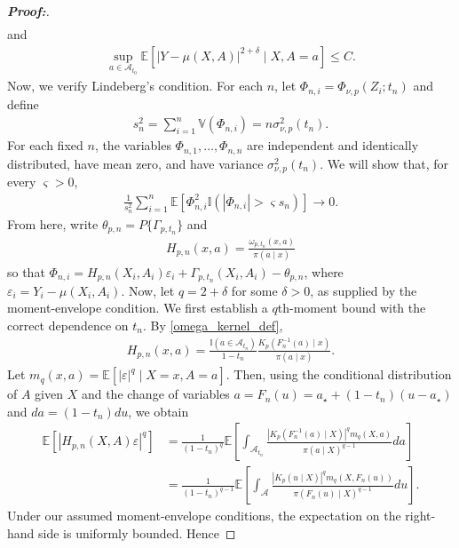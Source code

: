 \documentclass[10pt,a4paper]{amsart}
\begin{document}
\begin{proof}[\textbf{Proof:}]
\begin{align*}
\end{align*}
and
\begin{align*}
    \sup_{a\in\mathcal{A}_{t_0}} \mathbb{E}\!\left[ |Y-\mu(X,A)|^{2+\delta} \mid X,A=a \right] \leq C.
\end{align*}
Now, we verify Lindeberg's condition. For each $n$, let $\Phi_{n,i} = \Phi_{\nu,p}(Z_i;t_n)$ and define
\begin{align*}
    s_n^2 = \sum_{i=1}^{n}\mathbb{V}(\Phi_{n,i}) = n\sigma_{\nu,p}^2(t_n).
\end{align*}
For each fixed $n$, the variables $\Phi_{n,1},\ldots,\Phi_{n,n}$ are independent and identically distributed, have mean zero, and have variance $\sigma_{\nu,p}^2(t_n)$. We will show that, for every $\varsigma > 0$,
\begin{align*}
      \frac{1}{s_n^2} \sum_{i=1}^{n} \mathbb{E}\!\left[\Phi_{n,i}^2 \mathbb{I}\!\left( |\Phi_{n,i}|>\varsigma s_n \right) \right] \longrightarrow 0.
\end{align*}
From here, write $\theta_{p,n} = P \{\Gamma_{p,t_n}\}$ and
\begin{align*}
      H_{p,n}(x,a) = \frac{\omega_{p,t_n}(x,a)}{\pi(a\mid x)}
\end{align*}
so that $\Phi_{n,i} = H_{p,n}(X_i,A_i)\varepsilon_i + \Gamma_{p,t_n}(X_i,A_i) - \theta_{p,n}$, where $\varepsilon_i=Y_i-\mu(X_i,A_i)$. Now, let $q = 2+\delta$ for some $\delta > 0$, as supplied by the moment-envelope condition. We first establish a $q$th-moment bound with the correct dependence on $t_n$. By \cref{omega_kernel_def},
\begin{align*}
     H_{p,n}(x,a) = \frac{\mathbb{I}(a\in\mathcal A_{t_n})}{1-t_n} \frac{K_p\!\left(F_n^{-1}(a)\mid x\right)}{\pi(a\mid x) }.
\end{align*}
Let $m_q(x,a) = \mathbb{E}\!\left[ |\varepsilon|^q \mid X=x,A=a \right]$. Then, using the conditional distribution of $A$ given $X$ and the change of
variables $a=F_n(u)=a_\star+(1-t_n)(u-a_\star)$ and $da=(1-t_n)du$, we obtain
\begin{align*}
    \mathbb{E}\left[ \left| H_{p,n}(X,A)\varepsilon \right|^q \right] &= \frac{1}{(1-t_n)^q} \mathbb{E}\!\left[ \int_{\mathcal{A}_{t_n}} \frac{ \left| K_p(F_n^{-1}(a)\mid X) \right|^q m_q(X,a)}{\pi(a\mid X)^{q-1}} da \right] \\
    &= \frac{1}{(1-t_n)^{q-1}} \mathbb{E}\!\left[
        \int_{\mathcal{A}} \frac{ |K_p(u\mid X)|^q m_q(X,F_n(u))}{ \pi(F_n(u)\mid X)^{q-1} } du \right].
\end{align*}
Under our assumed moment-envelope conditions, the expectation on the right-hand side is uniformly bounded. Hence

\end{proof}
\end{document}
